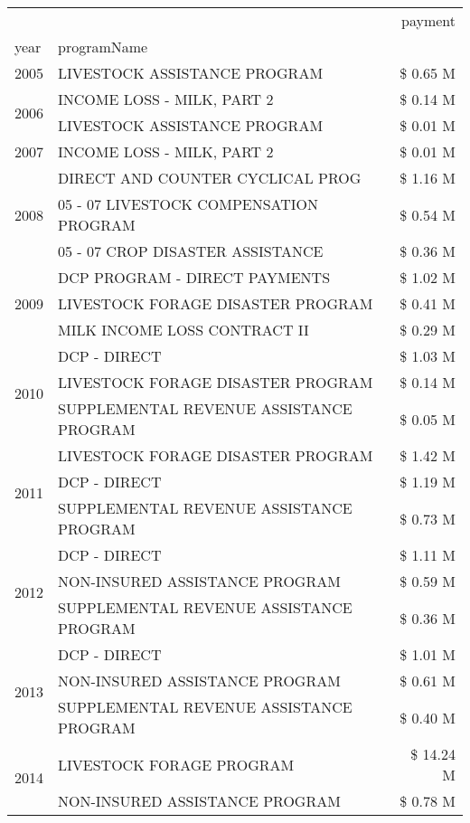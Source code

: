 \begin{tabular}{llr}
\toprule
 &  & payment \\
year & programName &  \\
\midrule
2005 & LIVESTOCK ASSISTANCE PROGRAM & \$ 0.65 M \\
\cline{1-3}
\multirow[t]{2}{*}{2006} & INCOME LOSS - MILK, PART 2 & \$ 0.14 M \\
 & LIVESTOCK ASSISTANCE PROGRAM & \$ 0.01 M \\
\cline{1-3}
2007 & INCOME LOSS - MILK, PART 2 & \$ 0.01 M \\
\cline{1-3}
\multirow[t]{3}{*}{2008} & DIRECT AND COUNTER CYCLICAL PROG & \$ 1.16 M \\
 & 05 - 07 LIVESTOCK COMPENSATION PROGRAM & \$ 0.54 M \\
 & 05 - 07 CROP DISASTER ASSISTANCE & \$ 0.36 M \\
\cline{1-3}
\multirow[t]{3}{*}{2009} & DCP PROGRAM - DIRECT PAYMENTS & \$ 1.02 M \\
 & LIVESTOCK FORAGE DISASTER  PROGRAM & \$ 0.41 M \\
 & MILK INCOME LOSS CONTRACT II & \$ 0.29 M \\
\cline{1-3}
\multirow[t]{3}{*}{2010} & DCP - DIRECT & \$ 1.03 M \\
 & LIVESTOCK FORAGE DISASTER PROGRAM & \$ 0.14 M \\
 & SUPPLEMENTAL REVENUE ASSISTANCE PROGRAM & \$ 0.05 M \\
\cline{1-3}
\multirow[t]{3}{*}{2011} & LIVESTOCK FORAGE DISASTER PROGRAM & \$ 1.42 M \\
 & DCP - DIRECT & \$ 1.19 M \\
 & SUPPLEMENTAL REVENUE ASSISTANCE PROGRAM & \$ 0.73 M \\
\cline{1-3}
\multirow[t]{3}{*}{2012} & DCP - DIRECT & \$ 1.11 M \\
 & NON-INSURED ASSISTANCE PROGRAM & \$ 0.59 M \\
 & SUPPLEMENTAL REVENUE ASSISTANCE PROGRAM & \$ 0.36 M \\
\cline{1-3}
\multirow[t]{3}{*}{2013} & DCP - DIRECT & \$ 1.01 M \\
 & NON-INSURED ASSISTANCE PROGRAM & \$ 0.61 M \\
 & SUPPLEMENTAL REVENUE ASSISTANCE PROGRAM & \$ 0.40 M \\
\cline{1-3}
\multirow[t]{3}{*}{2014} & LIVESTOCK FORAGE PROGRAM & \$ 14.24 M \\
 & NON-INSURED ASSISTANCE PROGRAM & \$ 0.78 M \\

\end{tabular}
